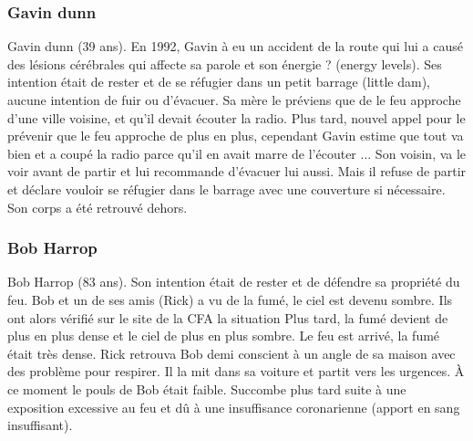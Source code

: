             \subsubsection{Gavin dunn}
                Gavin dunn (39 ans).
                En 1992, Gavin à eu un accident de la route qui lui a causé des lésions cérébrales qui affecte sa parole et son énergie ?
                (energy levels).
                Ses intention était de rester et de se réfugier dans un petit barrage (little dam), aucune intention de fuir ou d'évacuer.
                Sa mère le préviens que de le feu approche d'une ville voisine, et qu'il devait écouter la radio.
                Plus tard, nouvel appel pour le prévenir que le feu approche de plus en plus, cependant Gavin estime que tout va bien et
                a coupé la radio parce qu'il en avait marre de l'écouter ... Son voisin, va le voir avant de partir et lui recommande
                d'évacuer lui aussi. Mais il refuse de partir et déclare vouloir se réfugier dans le barrage avec une couverture si nécessaire.
                Son corps a été retrouvé dehors.

            \subsubsection{Bob Harrop}
                Bob Harrop (83 ans).
                Son intention était de rester et de défendre sa propriété du feu.
                Bob et un de ses amis (Rick) a vu de la fumé, le ciel est devenu sombre. Ils ont alors vérifié sur le site de la CFA la situation
                Plus tard, la fumé devient de plus en plus dense et le ciel de plus en plus sombre.
                Le feu est arrivé, la fumé était très dense. Rick retrouva Bob demi conscient à un angle de sa maison avec des problème pour
                respirer. Il la mit dans sa voiture et partit vers les urgences. À ce moment le pouls de Bob était faible.
                Succombe plus tard suite à une exposition excessive au feu et dû à une insuffisance coronarienne (apport en sang insuffisant).

